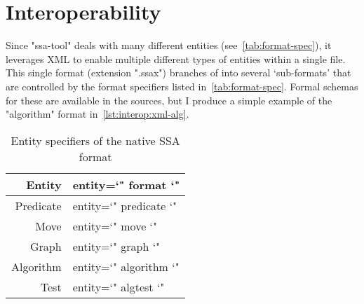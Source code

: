 \section{Interoperability}
\label{sec:iface-interoperability}
Since "ssa-tool" deals with many different entities (see~\autoref{tab:format-spec}),
  it leverages XML to enable multiple different types of entities within a single file.
This single format (extension ".ssax") branches of into several \enquote*{sub-formats}
  that are controlled by the format specifiers listed in~\autoref{tab:format-spec}.
Formal schemas for these are available in the sources,
  but I produce a simple example of the "algorithm" format in~\autoref{lst:interop:xml-alg}.


\begin{table}
  \centering
  \begin{tabular}{r>{\ttfamily\small entity=\char`"}l<{\char`"}}
    \toprule
    Entity    & format    \\
    \midrule
    Predicate & predicate \\
    Move      & move      \\
    Graph     & graph     \\
    Algorithm & algorithm \\
    Test      & algtest   \\
    \bottomrule
  \end{tabular}
  \caption{Entity specifiers of the native SSA format}
  \label{tab:format-spec}
\end{table}


